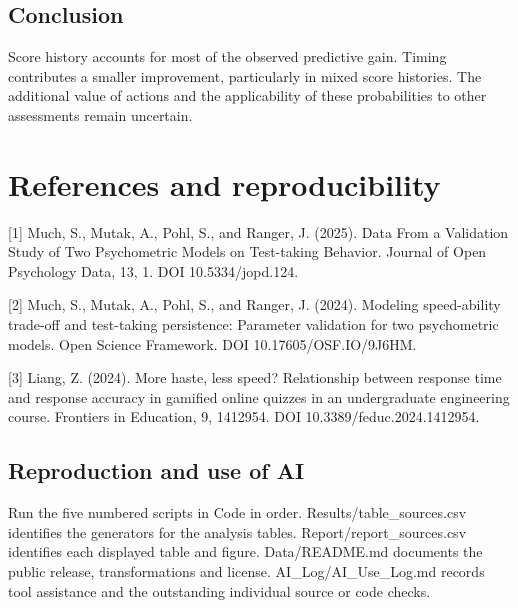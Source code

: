 \documentclass[10pt]{article}
\begin{document}
\subsection*{Conclusion}
Score history accounts for most of the observed predictive gain. Timing contributes a smaller improvement, particularly in mixed score histories. The additional value of actions and the applicability of these probabilities to other assessments remain uncertain.

\clearpage
\section*{References and reproducibility}
[1] Much, S., Mutak, A., Pohl, S., and Ranger, J. (2025). Data From a Validation Study of Two Psychometric Models on Test-taking Behavior. Journal of Open Psychology Data, 13, 1. DOI 10.5334/jopd.124.

[2] Much, S., Mutak, A., Pohl, S., and Ranger, J. (2024). Modeling speed-ability trade-off and test-taking persistence: Parameter validation for two psychometric models. Open Science Framework. DOI 10.17605/OSF.IO/9J6HM.

[3] Liang, Z. (2024). More haste, less speed? Relationship between response time and response accuracy in gamified online quizzes in an undergraduate engineering course. Frontiers in Education, 9, 1412954. DOI 10.3389/feduc.2024.1412954.

\subsection*{Reproduction and use of AI}
Run the five numbered scripts in Code in order. Results/table\_sources.csv identifies the generators for the analysis tables. Report/report\_sources.csv identifies each displayed table and figure. Data/README.md documents the public release, transformations and license. AI\_Log/AI\_Use\_Log.md records tool assistance and the outstanding individual source or code checks.
\end{document}
